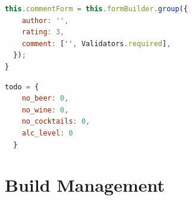 \documentclass[12pt]{article}
\begin{document}
\begin{lstlisting}[label = {lst:former}, language=javascript, caption={Former formgroup initialization},captionpos=b]
  this.commentForm = this.formBuilder.group({
    author: '',
    rating: 3,
    comment: ['', Validators.required],
  });
}

\end{lstlisting}


\begin{lstlisting}[label = {lst:latest},language=javascript, caption={Latest formgroup initialization},captionpos=b]
  todo = {
    no_beer: 0,
    no_wine: 0,
    no_cocktails: 0,
    alc_level: 0
  }
\end{lstlisting}



\newpage
\section{Build Management}
\end{document}
